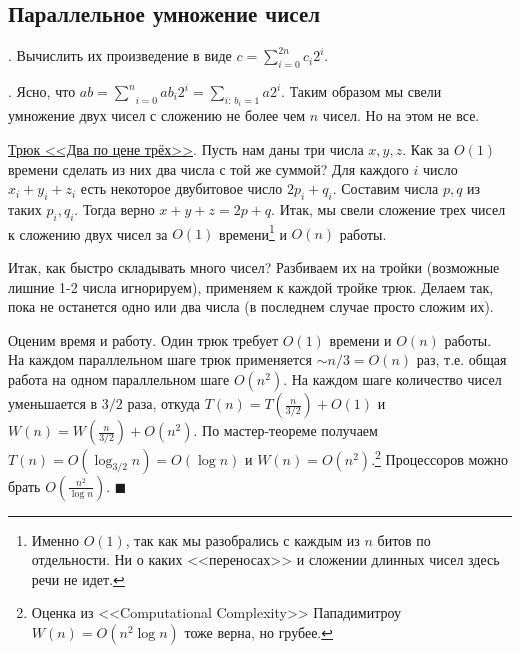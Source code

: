 \subsection{Параллельное умножение чисел}
. Вычислить их произведение в виде $c = \sum_{i=0}^{2n} c_i 2^i$.

.{} Ясно, что $ab = \underset{i=0}{\overset{n}{\sum}}a b_i 2^i = \underset{i: \, b_i=1}{\sum} a 2^i$. Таким образом мы свели умножение двух чисел с сложению не более чем $n$ чисел. Но на этом не все.

\underline{Трюк <<Два по цене трёх>>}. Пусть нам даны три числа $x, y, z$. Как за $O(1)$ времени сделать из них два числа с той же суммой? Для каждого $i$ число $x_i + y_i + z_i$ есть некоторое двубитовое число $2p_i + q_i$. Составим числа $p,q$ из таких $p_i, q_i$. Тогда верно $x+y+z = 2p+q$. Итак, мы свели сложение трех чисел к сложению двух чисел за $O(1)$ времени\footnote{Именно $O(1)$, так как мы разобрались с каждым из $n$ битов по отдельности. Ни о каких <<переносах>> и сложении длинных чисел здесь речи не идет.} и $O(n)$ работы.

Итак, как быстро складывать много чисел? Разбиваем их на тройки (возможные лишние 1-2 числа игнорируем), применяем к каждой тройке трюк. Делаем так, пока не останется одно или два числа (в последнем случае просто сложим их). 

Оценим время и работу. Один трюк требует $O(1)$ времени и $O(n)$ работы. На каждом параллельном шаге трюк применяется $\sim n/3 = O(n)$ раз, т.е. общая работа на одном параллельном шаге $O(n^2)$. На каждом шаге количество чисел уменьшается в $3/2$ раза, откуда $T(n) = T(\frac{n}{3/2}) + O(1)$ и $W(n) = W(\frac{n}{3/2}) + O(n^2)$. По мастер-теореме получаем $T(n) = O(\log_{3/2}n) = O(\log n)$ и $W(n) = O(n^2)$.\footnote{Оценка из <<Computational Complexity>> Пападимитроу $W(n) = O(n^2\log n)$ тоже верна, но грубее.} Процессоров можно брать $O(\frac{n^2}{\log n})$. $\blacksquare$